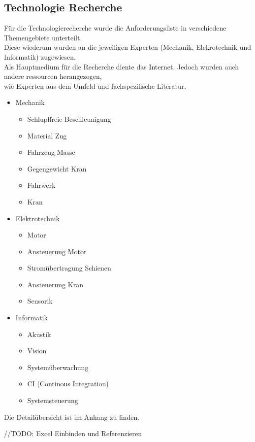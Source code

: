 \documentclass[../../main.tex]{subfiles}
\begin{document}
\subsection{Technologie Recherche}
Für die Technologierecherche wurde die Anforderungsliste in verschiedene Themengebiete unterteilt. \\
Diese wiederum wurden an die jeweiligen Experten (Mechanik, Elekrotechnik und Informatik) zugewiesen. \\
Als Hauptmedium für die Recherche diente das Internet. Jedoch wurden auch andere ressourcen herangezogen, \\
wie Experten aus dem Umfeld und fachspezifische Literatur.

\begin{itemize}
    \item Mechanik
    \begin{itemize}
        \item Schlupffreie Beschleunigung
        \item Material Zug
        \item Fahrzeug Masse
        \item Gegengewicht Kran
        \item Fahrwerk
        \item Kran
    \end{itemize}
    \item Elektrotechnik
    \begin{itemize}
        \item Motor
        \item Ansteuerung Motor
        \item Stromübertragung Schienen
        \item Ansteuerung Kran
        \item Sensorik
      \end{itemize}
    \item Informatik
    \begin{itemize}
        \item Akustik
        \item Vision
        \item Systemüberwachung
        \item CI (Continous Integration)
        \item Systemsteuerung
    \end{itemize}
\end{itemize}


Die Detailübersicht ist im Anhang zu finden. 

//TODO: Excel Einbinden und Referenzieren
\end{document}
